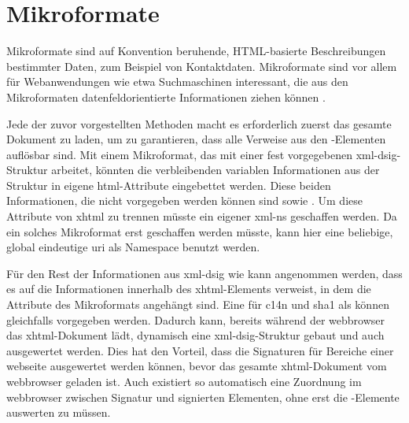 


\section{Mikroformate}
Mikroformate sind auf Konvention beruhende, HTML-basierte Beschreibungen bestimmter Daten, zum Beispiel von Kontaktdaten. Mikroformate sind vor allem für
Webanwendungen wie etwa Suchmaschinen interessant, die aus den Mikroformaten datenfeldorientierte Informationen ziehen können \cite{mikroformate}.

Jede der zuvor vorgestellten Methoden macht es erforderlich zuerst das gesamte Dokument zu laden, um zu garantieren, dass alle Verweise aus den
-Elementen auflösbar sind. Mit einem Mikroformat, das mit einer fest vorgegebenen \gls{xml-dsig}-Struktur arbeitet, könnten die verbleibenden
variablen Informationen aus der Struktur in eigene \gls{html}-Attribute eingebettet werden. Diese beiden Informationen, die nicht vorgegeben werden können sind
 sowie . Um diese Attribute von \gls{xhtml} zu trennen müsste ein eigener \gls{xml-ns} geschaffen werden. Da ein
solches Mikroformat erst geschaffen werden müsste, kann hier eine beliebige, global eindeutige \gls{uri} als Namespace benutzt werden.

Für den Rest der Informationen aus \gls{xml-dsig} wie  kann angenommen werden, dass es auf die Informationen innerhalb des
\gls{xhtml}-Elements verweist, in dem die Attribute des Mikroformats angehängt sind. Eine  für \gls{c14n} und \gls{sha1} als
 können gleichfalls vorgegeben werden. Dadurch kann, bereits während der \gls{webbrowser} das \gls{xhtml}-Dokument lädt, dynamisch eine
\gls{xml-dsig}-Struktur gebaut und auch ausgewertet werden. Dies hat den Vorteil, dass die Signaturen für Bereiche einer \gls{webseite} ausgewertet werden
können, bevor das gesamte \gls{xhtml}-Dokument vom \gls{webbrowser} geladen ist. Auch existiert so automatisch eine Zuordnung im \gls{webbrowser} zwischen
Signatur und signierten Elementen, ohne erst die -Elemente auswerten zu müssen.



